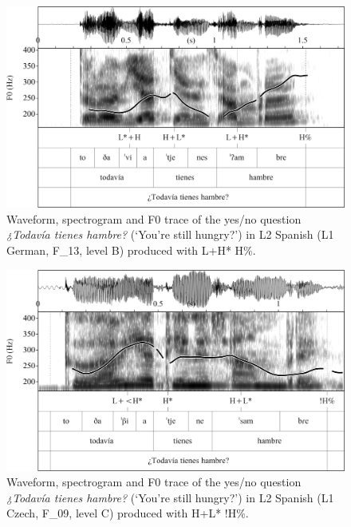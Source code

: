 \begin{figure}


\includegraphics[width=\textwidth]{figures/Figure_4.70.png}



\caption{Waveform, spectrogram and F0 trace of the yes/no question \textit{¿Todavía tienes hambre?} (‘You’re still hungry?’) in L2 Spanish (L1 German, F\_13, level B) produced with L+H* H\%.}
\label{fig:4.70}
\end{figure}

\begin{figure}


\includegraphics[width=\textwidth]{figures/Figure_4.71.png}



\caption{Waveform, spectrogram and F0 trace of the yes/no question \textit{¿Todavía tienes hambre?} (‘You’re still hungry?’) in L2 Spanish (L1 Czech, F\_09, level C) produced with H+L* !H\%.}
\label{fig:4.71}
\end{figure}


